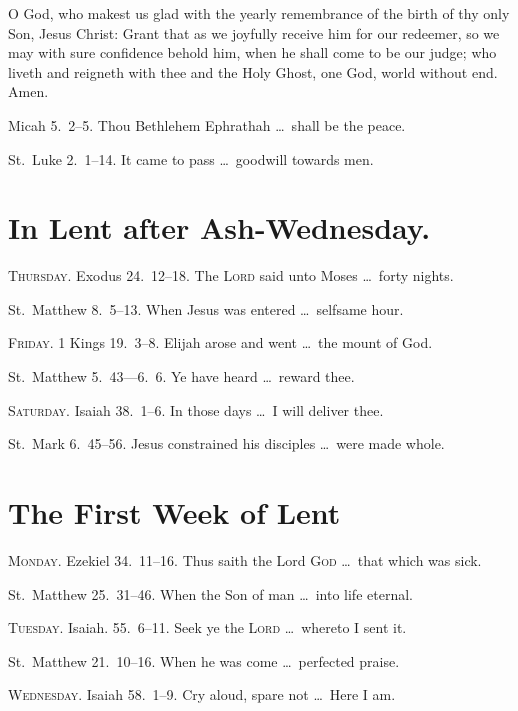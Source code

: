  O God, who makest us glad with the yearly remembrance of the birth of thy only Son, Jesus Christ: Grant that as we joyfully receive him for our redeemer, so we may with sure confidence behold him, when he shall come to be our judge; who liveth and reigneth with thee and the Holy Ghost, one God, world without end. \R Amen.

 Micah 5.~2–5. Thou Bethlehem Ephrathah \ldots\ shall be the peace.

 St.~Luke 2.~1–14. It came to pass \ldots\ goodwill towards men.


\section{In Lent {\normalfont after Ash-Wednesday.}}

{\scshape Thursday.}  Exodus 24.~12–18.   The {\scshape Lord} said unto Moses \ldots\ forty nights.

 St.~Matthew 8.~5–13.   When Jesus was entered \ldots\ selfsame hour.

{\scshape Friday.}  1 Kings 19.~3–8.   Elijah arose and went \ldots\ the mount of God.

 St.~Matthew 5.~43—6.~6.   Ye have heard \ldots\ reward thee.

{\scshape Saturday.}  Isaiah 38.~1–6.   In those days \ldots\ I will deliver thee.

 St.~Mark 6.~45–56.   Jesus constrained his disciples \ldots\ were made whole.

\section{The First Week of Lent}

{\scshape Monday.}  Ezekiel 34.~11–16.   Thus saith the Lord {\scshape God} \ldots\ that which was sick.

 St.~Matthew 25.~31–46.   When the Son of man \ldots\ into life eternal.

{\scshape Tuesday.}  Isaiah. 55.~6–11.   Seek ye the {\scshape Lord} \ldots\ whereto I sent it.

 St.~Matthew 21.~10–16.   When he was come \ldots\ perfected praise.

{\scshape Wednesday.}  Isaiah 58.~1–9.   Cry aloud, spare not \ldots\ Here I am.

